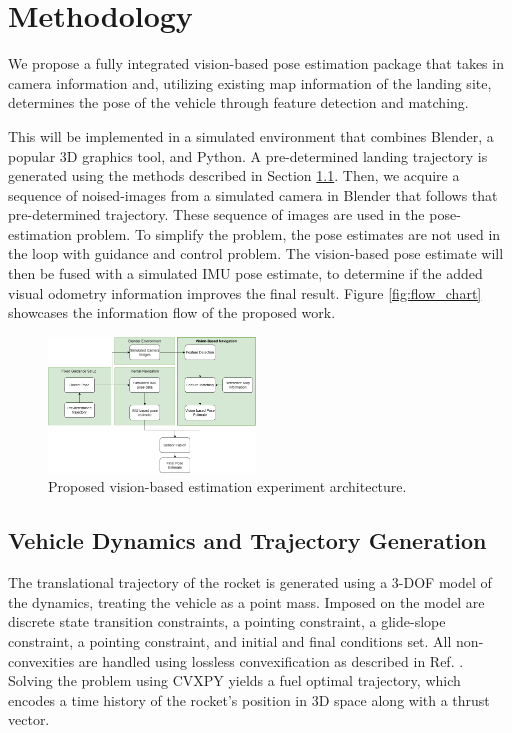 \documentclass[conference]{IEEEtran}
\begin{document}
\section{Methodology}

We propose a fully integrated vision-based pose estimation package that takes in camera information and, utilizing existing map information of the landing site, determines the pose of the vehicle through feature detection and matching.

This will be implemented in a simulated environment that combines Blender, a popular 3D graphics tool, and Python. A pre-determined landing trajectory is generated using the methods described in Section \ref{sec:dynamics}. Then, we acquire a sequence of noised-images from a simulated camera in Blender that follows that pre-determined trajectory. These sequence of images are used in the pose-estimation problem. To simplify the problem, the pose estimates are not used in the loop with guidance and control problem. The vision-based pose estimate will then be fused with a simulated IMU pose estimate, to determine if the added visual odometry information improves the final result. Figure \ref{fig:flow_chart} showcases the information flow of the proposed work.

\begin{figure}[htbp] \label{fig:flow_chart}
    \centerline{\includegraphics[width=0.49\textwidth]{273_project_flow.png}}
    \caption{Proposed vision-based estimation experiment architecture.}
    \label{fig:sys_arch}
\end{figure}

\subsection{Vehicle Dynamics and Trajectory Generation} \label{sec:dynamics}

The translational trajectory of the rocket is generated using a 3-DOF model of the dynamics, treating the vehicle as a point mass. Imposed on the model are discrete state transition constraints, a pointing constraint, a glide-slope constraint, a pointing constraint, and initial and final conditions set. 
All non-convexities are handled using lossless convexification as described in Ref. \cite{malyuta2021convex}. 
Solving the problem using CVXPY yields a fuel optimal trajectory, which encodes a time history of the rocket's position in 3D space along with a thrust vector. 
\end{document}
